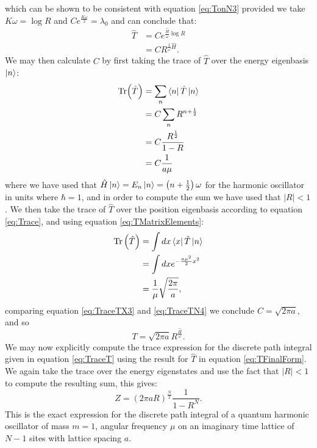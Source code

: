 \documentclass[12pt]{article}
\begin{document}
        which can be shown to be consistent with equation \ref{eq:TonN3} provided we take $K\omega=\log R$ and $Ce^{\frac{K\omega}{2}}=\lambda_0$ and can conclude that:
        \begin{align}
            \label{eq:TWithC1} \hat{T} & = Ce^{\frac{\hat{H}}{\omega}\log R } \\
            \label{eq:TWithC2}         & = CR^{\frac{1}{\omega}\hat{H}}.
        \end{align}
        We may then calculate $C$ by first taking the trace of $\hat{T}$ over the energy eigenbasis $\ket{n}$:
        \begin{align}
            \label{eq:TraceTN1} \text{Tr}{\left(\hat{T}\right)} & = \sum_{n}\bra{n}\hat{T}\ket{n} \\
            \label{eq:TraceTN2}                          & = C\sum_n R^{n+\frac{1}{2}} \\
            \label{eq:TraceTN3}                          & = C \frac{R^{\frac{1}{2}}}{1-R}\\
            \label{eq:TraceTN4}                          & = C\frac{1}{a\mu}
        \end{align}
        where we have used that $\hat{H}\ket{n} = E_n\ket{n} = \left(n+\frac{1}{2}\right)\omega$ for the harmonic oscillator in units where $\hbar=1$, and in order to compute the sum we have used that $|R| < 1$.
        We then take the trace of $\hat{T}$ over the position eigenbasis according to equation \ref{eq:Trace}, and using equation \ref{eq:TMatrixElements}:
        \begin{align}
            \label{eq:TraceTX1} \text{Tr}\left(\hat{T}\right) & = \int dx \bra{x}\hat{T}\ket{n} \\ 
            \label{eq:TraceTX2}                        & = \int dx e^{-\frac{a\mu^2}{2}x^2} \\
            \label{eq:TraceTX3}                        & = \frac{1}{\mu}\sqrt{\frac{2\pi}{a}},
        \end{align}
        comparing equation \ref{eq:TraceTX3} and \ref{eq:TraceTN4} we conclude $C=\sqrt{2\pi a}$, and so 
        \begin{equation}
            \label{eq:TFinalForm}
            T = \sqrt{2\pi a} R^{\frac{\hat{H}}{\omega}}.
        \end{equation}
        We may now explicitly compute the trace expression for the discrete path integral given in equation \ref{eq:TraceT} using the result for $\hat{T}$ in equation \ref{eq:TFinalForm}. We again take the trace over the energy eigenstates and use the fact that $|R|<1$ to compute the resulting sum, this gives:
        \begin{equation}
            \label{eq:DiscretePathIntegralExactForm}
            Z = \left(2\pi aR\right)^{\frac{N}{2}}\frac{1}{1-R^N}.
        \end{equation}
        This is the exact expression for the discrete path integral of a quantum harmonic oscillator of mass $m=1$, angular frequency $\mu$ on an imaginary time lattice of $N-1$ sites with lattice spacing $a$.
\end{document}
